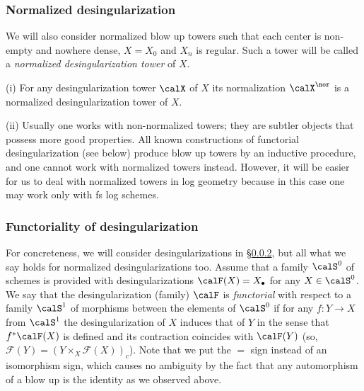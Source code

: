 \documentclass[10pt]{../fichiers-configuration-latex/smfart}
\begin{document}
\subsubsection{Normalized desingularization}\label{8-normdessec} We
will also consider normalized blow up towers such that each center
is non-empty and nowhere dense, $X=X_0$ and $X_n$ is regular. Such
a tower will be called a {\em normalized desingularization tower}
of $X$.

\begin{remark2}\label{8-normdesrem} (i) For any desingularization
tower $\calX$ of $X$ its normalization $\calX^\nor$ is a normalized
desingularization tower of $X$.

(ii) Usually one works with non-normalized towers; they are subtler
objects that possess more good properties. All known constructions of
functorial desingularization (see below) produce blow up towers by
an inductive procedure, and one cannot work with normalized towers
instead. However, it will be easier for us to deal with normalized
towers in log geometry because in this case one may work only with
fs log schemes.  \end{remark2}

\subsubsection{Functoriality of
desingularization}\label{8-functorsec} For concreteness, we will
consider desingularizations in \S\ref{8-functorsec}, but all what
we say holds for normalized desingularizations too. Assume that a
family $\calS^0$ of schemes is provided with desingularizations
$\calF(X)=X_\bullet$ for any $X\in\calS^0$. We say that the
desingularization (family) $\calF$ is {\em functorial} with respect
to a family $\calS^1$ of morphisms between the elements of $\calS^0$
if for any $f{\colon}Y\to X$ from $\calS^1$ the desingularization of
$X$ induces that of $Y$ in the sense that $f^*\calF(X)$ is defined
and its contraction coincides with $\calF(Y)$ (so, $\mathscr{F}(Y)
= (Y \times_X \mathscr{F}(X))_c$). Note that we put the $=$ sign
instead of an isomorphism sign, which causes no ambiguity by the
fact that any automorphism of a blow up is the identity as we
observed above.
\end{document}
